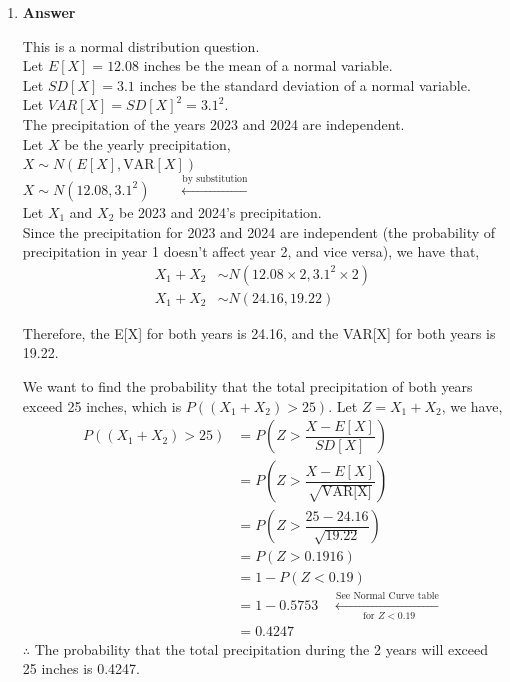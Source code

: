 \documentclass[12pt]{book}
\begin{document}
\newcommand{\reporttitle}{Assignment 2}
\newcommand{\reportauthorOne}{Kien Do}
\newcommand{\cidOne}{300163370}






\begin{enumerate}
    \item \textbf{Answer}
    
    This is a normal distribution question.\\
    
    Let $E[X] = 12.08$ inches be the mean of a normal variable.\\
    Let $SD[X] = 3.1$ inches be the standard deviation of a normal variable.\\
    Let $VAR[X] = SD[X]^2 = 3.1^2$.\\
    The precipitation of the years 2023 and 2024 are independent.\\
    
    Let $X$ be the yearly precipitation,\\
    $X \sim N(E[X], \text{VAR}[X])$\\
    $X \sim N(12.08,3.1^2) \qquad \xleftarrow[]{\text{by substitution}}$\\
    Let $X_1$ and $X_2$ be 2023 and 2024's precipitation.\\
    
    Since the precipitation for 2023 and 2024 are independent (the probability of precipitation in year 1 doesn't affect year 2, and vice versa), we have that,
    \begin{align*}
        X_1 + X_2 &\sim N(12.08 \times 2, 3.1^2 \times 2)\\
        X_1 + X_2 &\sim N(24.16, 19.22)
    \end{align*}
    
    Therefore, the E[X] for both years is 24.16, and the VAR[X] for both years is 19.22.
    
    We want to find the probability that the total precipitation of both years exceed 25 inches, which is $P((X_1 + X_2) > 25)$. Let $Z = X_1 + X_2$, we have,
    \begin{align*}
        P((X_1 + X_2) > 25) &= P\left(Z > \dfrac{X - E[X]}{SD[X]}\right)\\
        &= P\left(Z > \dfrac{X - E[X]}{\sqrt{\text{VAR[X]}}}\right)\\
        &= P\left(Z > \dfrac{25 - 24.16}{\sqrt{19.22}}\right)\\
        &= P\left(Z > 0.1916\right)\\
        &= 1 - P\left(Z < 0.19\right)\\
        &= 1 - 0.5753 \quad \xleftarrow[\text{ for $Z < 0.19$}]{\text{See Normal Curve table}}\\
        &= 0.4247
    \end{align*}
    $\therefore$ The probability that the total precipitation during the 2 years will exceed 25 inches is 0.4247.
    

\end{enumerate}
\end{document}
